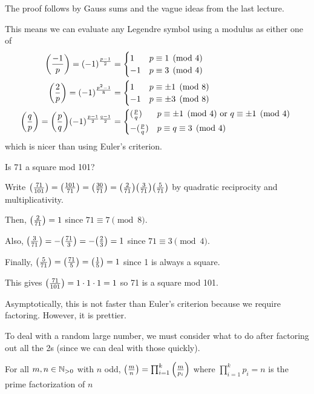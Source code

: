 \documentclass[notes]{agony}
\newcommand{\leg}[2]{\qty(\frac{#1}{#2})}
\begin{document}
The proof follows by Gauss sums and the vague ideas from the last lecture.

This means we can evaluate any Legendre symbol using a modulus as either one of
\begin{align*}
  \qty(\frac{-1}{p}) = (-1)^{\frac{p-1}{2}}
   & = \begin{cases}1 & p \equiv 1 \pmod 4 \\ -1 & p \equiv 3 \pmod 4\end{cases}         \\
  \qty(\frac{2}{p})  = (-1)^{\frac{p^2-1}{8}}
   & = \begin{cases}1 & p \equiv \pm 1 \pmod 8 \\ -1 & p \equiv \pm 3 \pmod 8\end{cases} \\
  \qty(\frac{q}{p})  = \qty(\frac{p}{q})(-1)^{\frac{p-1}{2}\frac{q-1}{2}}
   & = \begin{cases*}
         (\frac{p}{q})  & $p \equiv \pm 1 \pmod 4$ or $q \equiv \pm 1 \pmod 4$ \\
         -(\frac{p}{q}) & $p \equiv q \equiv 3 \pmod 4$
       \end{cases*}
\end{align*}
which is nicer than using Euler's criterion.

\begin{example}
  Is 71 a square mod 101?
\end{example}
\begin{sol}
  Write $\leg{71}{101} = \leg{101}{71} = \leg{30}{71} = \leg{2}{71}\leg{3}{71}\leg{5}{71}$
  by quadratic reciprocity and multiplicativity.

  Then, $\leg{2}{71} = 1$ since $71 \equiv 7 \pmod 8$.

  Also, $\leg{3}{71} = -\leg{71}{3} = -\leg{2}{3} = 1$ since $71 \equiv 3 \pmod 4$.

  Finally, $\leg{5}{71} = \leg{71}{5} = \leg{1}{5} = 1$ since 1 is always a square.

  This gives $\leg{71}{101} = 1\cdot 1 \cdot 1 = 1$ so 71 is a square mod 101.
\end{sol}

Asymptotically, this is not faster than Euler's criterion
because we require factoring. However, it is prettier.

To deal with a random large number, we must consider what to do
after factoring out all the 2s (since we can deal with those quickly).

\begin{defn}
  For all $m,n \in \mathbb{N}_{>0}$ with $n$ odd, $\leg{m}{n} = \prod_{i=1}^k \leg{m}{p_i}$
  where $\prod_{i=1}^k p_i = n$ is the prime factorization of $n$
\end{defn}
\end{document}
